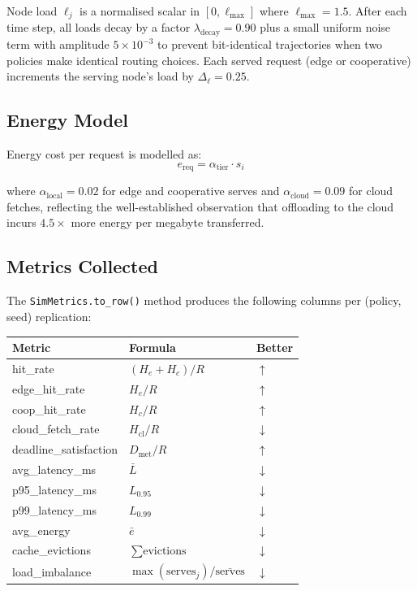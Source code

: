 \documentclass[12pt]{article}
\begin{document}
Node load $\ell_j$ is a normalised scalar in $[0, \ell_{\max}]$ where $\ell_{\max} = 1.5$. After each time step, all loads decay by a factor $\lambda_{\text{decay}} = 0.90$ plus a small uniform noise term with amplitude $5 \times 10^{-3}$ to prevent bit-identical trajectories when two policies make identical routing choices. Each served request (edge or cooperative) increments the serving node's load by $\Delta_{\ell} = 0.25$.

\subsection{Energy Model}

Energy cost per request is modelled as:
\begin{equation}
  e_{\text{req}} = \alpha_{\text{tier}} \cdot s_i
\end{equation}

where $\alpha_{\text{local}} = 0.02$ for edge and cooperative serves and $\alpha_{\text{cloud}} = 0.09$ for cloud fetches, reflecting the well-established observation that offloading to the cloud incurs $4.5\times$ more energy per megabyte transferred.

\subsection{Metrics Collected}

The \texttt{SimMetrics.to\_row()} method produces the following columns per (policy, seed) replication:

\begin{tabularx}{\linewidth}{@{}l l X@{}}
\toprule
\textbf{Metric} & \textbf{Formula} & \textbf{Better} \\
\midrule
hit\_rate & $(H_e + H_c) / R$ & $\uparrow$ \\
edge\_hit\_rate & $H_e / R$ & $\uparrow$ \\
coop\_hit\_rate & $H_c / R$ & $\uparrow$ \\
cloud\_fetch\_rate & $H_{\text{cl}} / R$ & $\downarrow$ \\
deadline\_satisfaction & $D_{\text{met}} / R$ & $\uparrow$ \\
avg\_latency\_ms & $\bar{L}$ & $\downarrow$ \\
p95\_latency\_ms & $L_{0.95}$ & $\downarrow$ \\
p99\_latency\_ms & $L_{0.99}$ & $\downarrow$ \\
avg\_energy & $\bar{e}$ & $\downarrow$ \\
cache\_evictions & $\sum \text{evictions}$ & $\downarrow$ \\
load\_imbalance & $\max(\text{serves}_j) / \bar{\text{serves}}$ & $\downarrow$ \\
\bottomrule
\end{tabularx}
\end{document}

